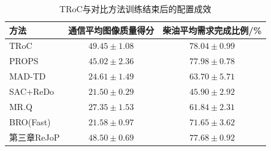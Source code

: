 \begin{table}[H]
 \centering
 \caption{TRoC与对比方法训练结束后的配置成效}
 \label{tab:ch4-formal-results}
 \begingroup\small
 \setlength{\tabcolsep}{7pt}
 \renewcommand{\arraystretch}{1.12}
 \begin{tabular}{lcc}
 \toprule
方法 & 通信平均图像质量得分 & 柴油平均需求完成比例/\% \\
 \midrule
TRoC & \(49.45\pm1.08\) & \(78.04\pm0.99\) \\
PROPS & \(45.02\pm2.36\) & \(77.98\pm0.78\) \\
MAD-TD & \(24.61\pm1.49\) & \(63.70\pm5.71\) \\
SAC+ReDo & \(21.50\pm0.29\) & \(45.90\pm2.92\) \\
MR.Q & \(27.35\pm1.53\) & \(61.84\pm2.31\) \\
BRO(Fast) & \(21.58\pm0.97\) & \(71.65\pm3.62\) \\
第三章ReJoP & \(48.50\pm0.69\) & \(77.68\pm0.92\) \\
 \bottomrule
 \end{tabular}
 \endgroup
\end{table}
